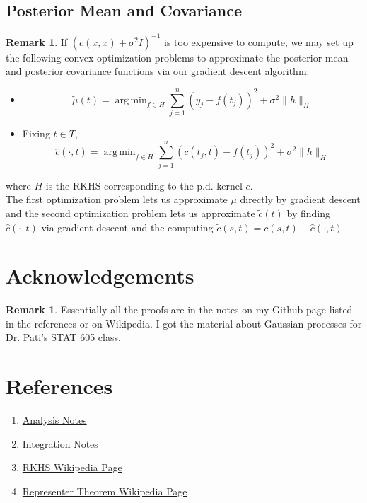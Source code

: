 \documentclass[twoside]{article}
\theoremstyle{definition}
\theoremstyle{definition}
\newtheorem{rem}[definition]{Remark}
\newcommand{\sig}{\sigma}
\DeclareMathOperator*{\argmin}{arg\,min}
\begin{document}
\subsection{Posterior Mean and Covariance}
\begin{rem}
If $(c(x,x) + \sig^2I)^{-1}$ is too expensive to compute, we may set up the following convex optimization problems to approximate the posterior mean and posterior covariance functions via our gradient descent algorithm:
\begin{itemize}
\item $$\tilde{\mu}(t) = \argmin_{f \in H} \sum_{j=1}^n (y_j - f(t_j))^2 + \sig^2 \|h\|_H$$ 
\item Fixing $t \in T$, $$\hat{c}(\cdot, t) = \argmin_{f \in H} \sum_{j=1}^n (c(t_j, t) - f(t_j))^2 + \sig^2 \|h\|_H$$
\end{itemize}
where $H$ is the RKHS corresponding to the p.d. kernel $c$. \\
The first optimization problem lets us approximate $\tilde{\mu}$ directly by gradient descent and the second optimization problem lets us approximate $\tilde{c}(t)$ by finding $\hat{c}(\cdot, t)$ via gradient descent and the computing $\tilde{c}(s, t) = c(s, t) - \hat{c}(\cdot, t)$.
\end{rem}

\section*{Acknowledgements}
\begin{rem}
Essentially all the proofs are in the notes on my Github page listed in the references or on Wikipedia. I got the material about Gaussian processes for Dr. Pati's STAT 605 class.  
\end{rem}

\section*{References}
\begin{enumerate}
\item \href{https://github.com/carsonaj/Mathematics/blob/master/Introduction\%20to\%20Analysis/Introduction\%20to\%20Analysis.pdf}{Analysis Notes}

\item \href{https://github.com/carsonaj/Mathematics/blob/master/Introduction\%20to\%20Measure\%20and\%20Integration/Introduction\%20to\%20Measure\%20and\%20Integration.pdf}{Integration Notes}

\item \href{https://en.wikipedia.org/wiki/Reproducing_kernel_Hilbert_space}{RKHS Wikipedia Page}

\item \href{https://en.wikipedia.org/wiki/Representer_theorem}{Representer Theorem Wikipedia Page}
\end{enumerate}
\end{document}
